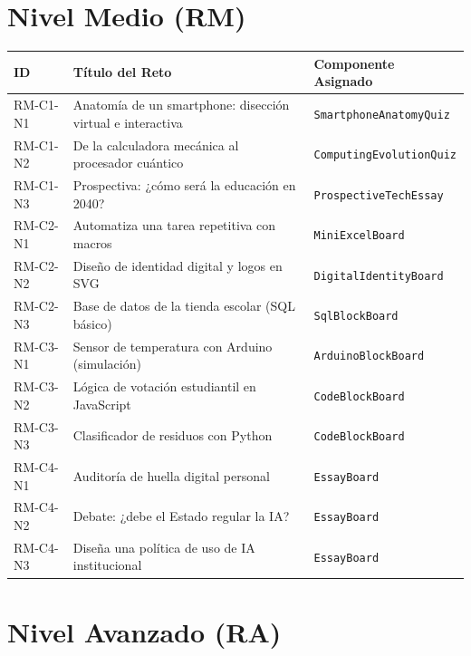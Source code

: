 \documentclass{article}
\begin{document}
\newpage
\section*{Nivel Medio (RM)}

\begin{table}[h!]
    \centering
    \renewcommand{\arraystretch}{1.3}
    \begin{tabularx}{\textwidth}{l X l}
        \toprule
        \textbf{ID} & \textbf{Título del Reto} & \textbf{Componente Asignado} \\
        \midrule
        RM-C1-N1 & Anatomía de un smartphone: disección virtual e interactiva & \texttt{SmartphoneAnatomyQuiz} \\
        RM-C1-N2 & De la calculadora mecánica al procesador cuántico & \texttt{ComputingEvolutionQuiz} \\
        RM-C1-N3 & Prospectiva: ¿cómo será la educación en 2040? & \texttt{ProspectiveTechEssay} \\
        RM-C2-N1 & Automatiza una tarea repetitiva con macros & \texttt{MiniExcelBoard} \\
        RM-C2-N2 & Diseño de identidad digital y logos en SVG & \texttt{DigitalIdentityBoard} \\
        RM-C2-N3 & Base de datos de la tienda escolar (SQL básico) & \texttt{SqlBlockBoard} \\
        RM-C3-N1 & Sensor de temperatura con Arduino (simulación) & \texttt{ArduinoBlockBoard} \\
        RM-C3-N2 & Lógica de votación estudiantil en JavaScript & \texttt{CodeBlockBoard} \\
        RM-C3-N3 & Clasificador de residuos con Python & \texttt{CodeBlockBoard} \\
        RM-C4-N1 & Auditoría de huella digital personal & \texttt{EssayBoard} \\
        RM-C4-N2 & Debate: ¿debe el Estado regular la IA? & \texttt{EssayBoard} \\
        RM-C4-N3 & Diseña una política de uso de IA institucional & \texttt{EssayBoard} \\
        \bottomrule
    \end{tabularx}
\end{table}

\section*{Nivel Avanzado (RA)}
\end{document}
